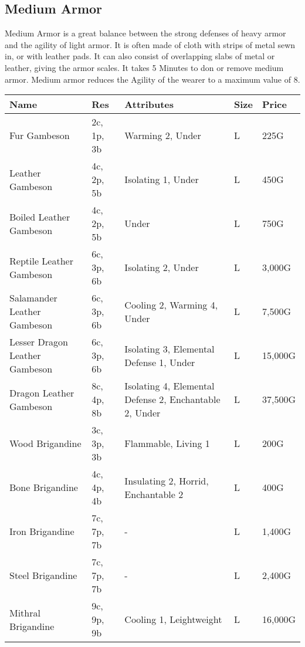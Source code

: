 \onecolumn
\subsection{Medium Armor}
Medium Armor is a great balance between the strong defenses of heavy armor and the agility of light armor. It is often made of cloth with strips of metal sewn in, or with leather pads. It can also consist of overlapping slabs of metal or leather, giving the armor scales. It takes 5 Minutes to don or remove medium armor. Medium armor reduces the Agility of the wearer to a maximum value of 8.
\begin{longtable}{p{3.5cm} | p{1.5cm} | p{5cm} | p{1cm} | p{1.25cm}}
	Name & Res & Attributes & Size & Price\\ \hline
	
	Fur Gambeson & 2c, 1p, 3b & Warming 2, Under & L & 225G\\
	
	Leather Gambeson & 4c, 2p, 5b & Isolating 1, Under & L & 450G\\
	
	Boiled Leather Gambeson & 4c, 2p, 5b & Under & L & 750G\\
	
	Reptile Leather Gambeson & 6c, 3p, 6b & Isolating 2, Under & L & 3,000G\\
	
	Salamander Leather Gambeson & 6c, 3p, 6b & Cooling 2, Warming 4, Under & L & 7,500G\\
	
	Lesser Dragon Leather Gambeson & 6c, 3p, 6b & Isolating 3, Elemental Defense 1, Under & L & 15,000G\\
	
	Dragon Leather Gambeson & 8c, 4p, 8b & Isolating 4, Elemental Defense 2, Enchantable 2, Under & L & 37,500G\\
	
	Wood Brigandine & 3c, 3p, 3b & Flammable, Living 1 & L & 200G\\
	
	Bone Brigandine & 4c, 4p, 4b & Insulating 2, Horrid, Enchantable 2 & L & 400G\\
	
	Iron Brigandine & 7c, 7p, 7b & - & L & 1,400G\\
	
	Steel Brigandine & 7c, 7p, 7b & - & L & 2,400G\\
	
	Mithral Brigandine & 9c, 9p, 9b & Cooling 1, Leightweight & L & 16,000G\\
	

\end{longtable}
